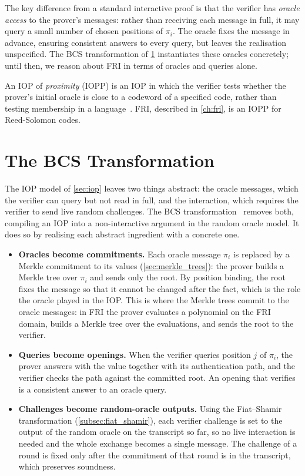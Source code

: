 The key difference from a standard interactive proof is that the
verifier has \emph{oracle access} to the prover's messages: rather than
receiving each message in full, it may query a small number of chosen
positions of $\pi_i$. The oracle fixes the message in advance, ensuring 
consistent answers to every query, but leaves the realisation unspecified. 
The BCS transformation of \cref{sec:bcs} instantiates these oracles concretely; 
until then, we reason about FRI in terms of oracles and queries alone.

An IOP of \emph{proximity} (IOPP) is an IOP in which the verifier tests
whether the prover's initial oracle is close to a codeword of a
specified code, rather than testing membership in a
language~\cite{BBHR18}. FRI, described in \cref{ch:fri}, is an IOPP for
Reed-Solomon codes.


 
\section{The BCS Transformation}
\label{sec:bcs}
 
The IOP model of \cref{sec:iop} leaves two things abstract: the oracle
messages, which the verifier can query but not read in full, and the
interaction, which requires the verifier to send live random challenges.
The BCS transformation~\cite{BCS16} removes both, compiling an IOP into a
non-interactive argument in the random oracle model. It does so by
realising each abstract ingredient with a concrete one.
 
\begin{itemize}
  \item \textbf{Oracles become commitments.} Each oracle message
    $\pi_i$ is replaced by a Merkle commitment to its values
    (\cref{sec:merkle_trees}): the prover builds a Merkle tree over
    $\pi_i$ and sends only the root. By position binding, the root fixes
    the message so that it cannot be changed after the fact, which is the
    role the oracle played in the IOP. This is where the Merkle trees
    commit to the oracle messages: in FRI the prover evaluates a
    polynomial on the FRI domain, builds a Merkle tree over the
    evaluations, and sends the root to the verifier.
  \item \textbf{Queries become openings.} When the verifier queries
    position $j$ of $\pi_i$, the prover answers with the value together
    with its authentication path, and the verifier checks the path
    against the committed root. An opening that verifies is a consistent
    answer to an oracle query.
  \item \textbf{Challenges become random-oracle outputs.} Using the Fiat–Shamir 
    transformation (\cref{subsec:fiat_shamir}), each verifier challenge is set to 
    the output of the random oracle on the transcript so far, so no live interaction is needed
    and the whole exchange becomes a single message. The challenge of a
    round is fixed only after the commitment of that round is in the
    transcript, which preserves soundness.
\end{itemize}
 
